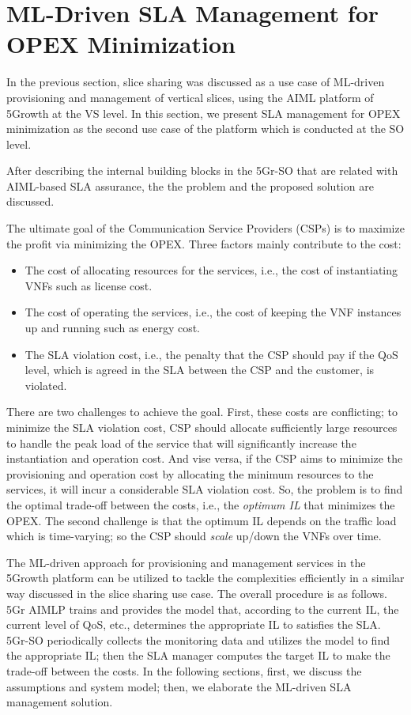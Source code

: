 \documentclass[conference, final]{IEEEtran}
\newcommand{\hlb}[2][blue]{{\color{#1} {#2}}\unskip }
\begin{document}
\title{}


\section{\hlb{ML-Driven SLA Management for OPEX Minimization}}
\label{sec:SLA-Management}
\hlb{

In the previous section, slice sharing was discussed as a use case of ML-driven provisioning and management of vertical slices, using the AIML platform of 5Growth at the VS level. In this section, we present SLA management for OPEX minimization as the second use case of the platform which is conducted at the SO level. 


After  describing  the  internal  building  blocks  in  the 5Gr-SO that are related with AIML-based SLA assurance, the the problem and the proposed solution are discussed.

The ultimate goal of the Communication Service Providers (CSPs) is to maximize the profit via minimizing the OPEX. Three factors mainly contribute to the cost:
\begin{itemize} 
\item The cost of allocating resources for the services, i.e., the cost of instantiating VNFs such as license cost.
\item The cost of operating the services, i.e., the cost of keeping the VNF instances up and running such as energy cost.
\item The SLA violation cost, i.e., the penalty that the CSP should pay if the QoS level, which is agreed in the SLA between the CSP and the customer, is violated.
\end{itemize}

There are two challenges to achieve the goal. First, these costs are conflicting; to minimize the SLA violation cost, CSP should allocate sufficiently large resources to handle the peak load of the service that will significantly increase the instantiation and operation cost. And vise versa, if the CSP aims to minimize the provisioning and operation cost by allocating the minimum resources to the services, it will incur a considerable SLA violation cost. So, the problem is to find the optimal trade-off between the costs, i.e., the \textit{optimum IL} that minimizes the OPEX. The second challenge is that the optimum IL depends on the traffic load which is time-varying; so the CSP should \textit{scale} up/down the VNFs over time.

The ML-driven approach for provisioning and management services in the 5Growth platform can be utilized to tackle the complexities efficiently in a similar way discussed in the slice sharing use case. The overall procedure is as follows. 5Gr AIMLP trains and provides the model that, according to the current IL, the current level of QoS, etc., determines the appropriate IL to satisfies the SLA. 5Gr-SO periodically collects the monitoring data and utilizes the model to find the appropriate IL; then the SLA manager computes the target IL to make the trade-off between the costs. In the following sections, first, we discuss the assumptions and system model; then, we elaborate the ML-driven SLA management solution.

} %
\end{document}

